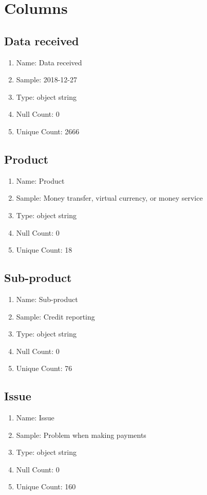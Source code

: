 \documentclass{article}
\begin{document}
\section{Columns}
\subsection{Data received}
\begin{enumerate}
\item Name: Data received
\item Sample: 2018-12-27
\item Type: object string
\item Null Count: 0
\item Unique Count: 2666
\end{enumerate}

\subsection{Product}
\begin{enumerate}
\item Name: Product
\item Sample: Money transfer, virtual currency, or money service
\item Type: object string
\item Null Count: 0
\item Unique Count: 18
\end{enumerate}

\subsection{Sub-product}
\begin{enumerate}
\item Name: Sub-product
\item Sample: Credit reporting
\item Type: object string
\item Null Count: 0
\item Unique Count: 76
\end{enumerate}

\subsection{Issue}
\begin{enumerate}
\item Name: Issue
\item Sample: Problem when making payments
\item Type: object string
\item Null Count: 0
\item Unique Count: 160
\end{enumerate}
\end{document}
